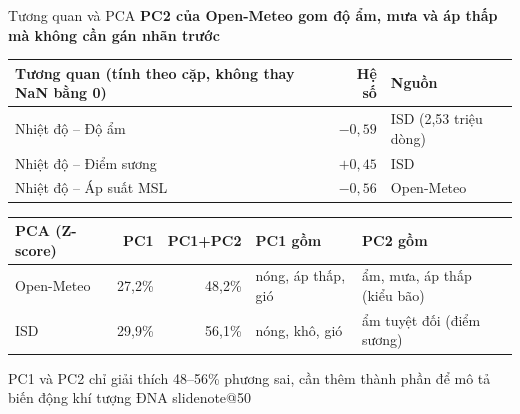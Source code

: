 \documentclass[t,aspectratio=169,12pt]{beamer}
\makeatletter
\newcommand{\slidenote}[1]{\ifcsname slidenote@#1\endcsname\note{\csname slidenote@#1\endcsname}\fi}
\newcommand{\ketluan}[1]{\vskip2mm{\color{hustred}#1}}
\newcommand{\ychinh}[1]{\vskip1mm{\bfseries #1}\par\vskip1mm}
\makeatother
\begin{document}
\begin{frame}{Tương quan và PCA}
  \ychinh{PC2 của Open-Meteo gom độ ẩm, mưa và áp thấp mà không cần gán nhãn trước}
  \centering\footnotesize
  \begin{tabular}{@{}lrl@{}}
    \toprule
    Tương quan (tính theo cặp, không thay NaN bằng 0) & Hệ số & Nguồn \\
    \midrule
    Nhiệt độ -- Độ ẩm & $-0{,}59$ & ISD (2,53 triệu dòng) \\
    Nhiệt độ -- Điểm sương & $+0{,}45$ & ISD \\
    Nhiệt độ -- Áp suất MSL & $-0{,}56$ & Open-Meteo \\
    \bottomrule
  \end{tabular}

  \vspace{2mm}
  \begin{tabular}{@{}lrrll@{}}
    \toprule
    PCA (Z-score) & PC1 & PC1+PC2 & PC1 gồm & PC2 gồm \\
    \midrule
    Open-Meteo & 27,2\% & 48,2\% & nóng, áp thấp, gió & ẩm, mưa, áp thấp (kiểu bão) \\
    ISD & 29,9\% & 56,1\% & nóng, khô, gió & ẩm tuyệt đối (điểm sương) \\
    \bottomrule
  \end{tabular}
  \raggedright
  \ketluan{\small PC1 và PC2 chỉ giải thích 48--56\% phương sai, cần thêm thành phần để mô tả biến động khí tượng ĐNA}
  \slidenote{50}
\end{frame}
\end{document}
